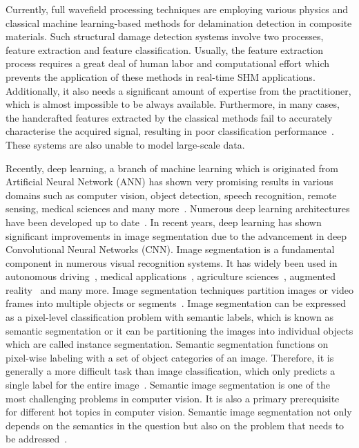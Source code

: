 Currently, full wavefield processing techniques are employing various physics and classical machine learning-based methods for delamination detection in composite materials. Such structural damage detection systems involve two processes, feature extraction and feature classification. Usually, the feature extraction process requires a great deal of human labor and computational effort which prevents the application of these methods in real-time SHM applications. Additionally, it also needs a significant amount of expertise from the practitioner, which is almost impossible to be always available. Furthermore, in many cases, the handcrafted features extracted by the classical methods fail to accurately characterise the acquired signal, resulting in poor classification performance~\cite{zhao2019deep, yuan2020machine}. These systems are also unable to model large-scale data.

Recently, deep learning, a branch of machine learning which is originated from Artificial Neural Network (ANN) has shown very promising results in various domains such as computer vision, object detection, speech recognition, remote sensing, medical sciences and many more~\cite{deng2014deep, mohanty2016using, zhang2020well, pashaei2020review}. Numerous deep learning architectures have been developed up to date~\cite{zhao2019deep}. In recent years, deep learning has shown significant improvements in image segmentation due to the advancement in deep Convolutional Neural Networks (CNN). Image segmentation is a fundamental component in numerous visual recognition systems. It has widely been used in autonomous driving~\cite{zhang2013understanding, cordts2016cityscapes, ros2016synthia, li2018real}, medical applications~\cite{taghanaki2020deep}, agriculture sciences~\cite{milioto2018real}, augmented reality~\cite{miksik2015semantic} and many more. Image segmentation techniques partition images or video frames into multiple objects or segments~\cite{szeliski2010computer}. Image segmentation can be expressed as a pixel-level classification problem with semantic labels, which is known as semantic segmentation or it can be partitioning the images into individual objects which are called instance segmentation. Semantic segmentation functions on pixel-wise labeling with a set of object categories of an image. Therefore, it is generally a more difficult task than image classification, which only predicts a single label for the entire image~\cite{minaee2020image}. Semantic image segmentation is one of the most challenging problems in computer vision. It is also a primary prerequisite for different hot topics in computer vision. Semantic image segmentation not only depends on the semantics in the question but also on the problem that needs to be addressed~\cite{ghosh2019understanding}.

